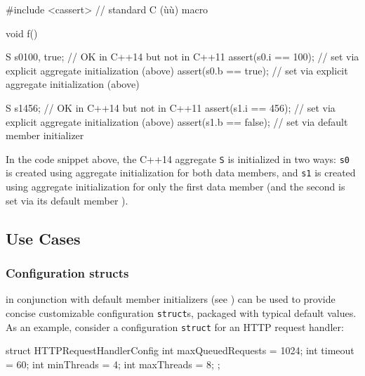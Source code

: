 \begin{emcppshiddenlisting}[emcppsbatch=e3]
#include <cassert>  // standard C (ù{}ù) macro
\end{emcppshiddenlisting}
\begin{emcppslisting}[emcppsbatch=e3,emcppsstandards={c++14}]
void f()
{
    S s0{100, true};        // OK in C++14 but not in C++11
    assert(s0.i == 100);    // set via explicit aggregate initialization (above)
    assert(s0.b == true);   // set via explicit aggregate initialization (above)

    S s1{456};              // OK in C++14 but not in C++11
    assert(s1.i == 456);    // set via explicit aggregate initialization (above)
    assert(s1.b == false);  // set via default member initializer
}
\end{emcppslisting}

\noindent In the code snippet above, the C++14 aggregate \lstinline!S! is initialized
in two ways: \lstinline!s0! is created using aggregate initialization for
both data members, and \lstinline!s1! is created using aggregate
initialization for only the first data member (and the second is set via its
default member ).

\subsection[Use Cases]{Use Cases}\label{use-cases}

\subsubsection[Configuration \lstinline!struct!s]{Configuration {\SubsubsecCode struct}s}\label{configuration-structs}

 in conjunction with default member initializers (see ) can be used to provide concise customizable
configuration \lstinline!struct!s, packaged with typical default values. As
an example, consider a configuration \lstinline!struct! for an HTTP request
handler:

\begin{emcppslisting}[emcppsbatch=e4,emcppsstandards={c++14}]
struct HTTPRequestHandlerConfig
{
    int maxQueuedRequests = 1024;
    int timeout           = 60;
    int minThreads        = 4;
    int maxThreads        = 8;
};
\end{emcppslisting}

